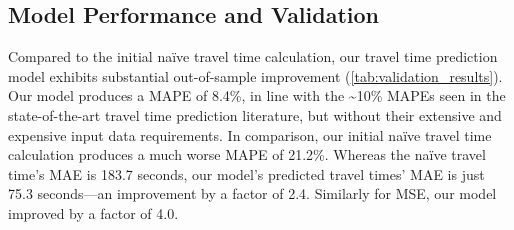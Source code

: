 \documentclass[12pt,letterpaper]{article} %
\begin{document}
\subsection{Model Performance and Validation}

\begin{table}[tb!]
    \centering\small
    \caption{Out-of-sample prediction accuracy of our chosen model (random forest, bold) versus the initial naïve travel time model and the discarded alternative models, all validated against the corresponding true travel times. $n$ = 8,272 for each. The six accuracy indicators are (1) MAPE \%, (2) MAE in seconds, (3) MSE in square seconds, (4) difference-in-means ($\delta$) in seconds and its corresponding $t$-test's $p$-value, (5) APR, and (6) $R^2$. See methods for definitions.}\label{tab:validation_results}
\end{table}

Compared to the initial naïve travel time calculation, our travel time prediction model exhibits substantial out-of-sample improvement (\autoref{tab:validation_results}). Our model produces a MAPE of 8.4\%, in line with the \textasciitilde10\% MAPEs seen in the state-of-the-art travel time prediction literature, but without their extensive and expensive input data requirements. In comparison, our initial naïve travel time calculation produces a much worse MAPE of 21.2\%. Whereas the naïve travel time's MAE is 183.7 seconds, our model's predicted travel times' MAE is just 75.3 seconds---an improvement by a factor of 2.4. Similarly for MSE, our model improved by a factor of 4.0.
\end{document}
